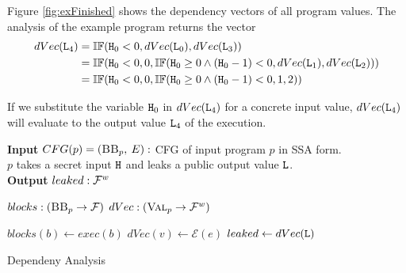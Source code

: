 Figure \ref{fig:exFinished} shows the dependency vectors of all program values. The analysis of the example program returns the vector
\begin{align*}
    dVec(\mathtt{L}_4) &= \mathbb{IF}(\mathtt{H}_0 < 0, dVec(\mathtt{L}_0), dVec(\mathtt{L}_3)) \\
    &= \mathbb{IF}(\mathtt{H}_0 < 0, 0, \mathbb{IF}(\mathtt{H}_0 \geq 0 \land (\mathtt{H}_0 - 1) < 0, dVec(\mathtt{L}_1), dVec(\mathtt{L}_2))) \\
    &= \mathbb{IF}(\mathtt{H}_0 < 0, 0, \mathbb{IF}(\mathtt{H}_0 \geq 0 \land (\mathtt{H}_0 - 1) < 0, 1, 2))
\end{align*}

If we substitute the variable $\mathtt{H}_0$ in $dVec(\mathtt{L}_4)$ for a concrete input value, $dVec(\mathtt{L}_4)$ will evaluate to the output value $\mathtt{L}_4$ of the execution.

\begin{algorithm}
        \hspace*{\algorithmicindent} \textbf{Input} $CFG(p) = (\mbb_p, \: E):$ CFG of input program $p$ in SSA form.\\ 
        \hspace*{\algorithmicindent} \hspace*{\algorithmicindent} $p$ takes a secret input $\mathtt{H}$ and leaks a public output value $\mathtt{L}$. \\
        \hspace*{\algorithmicindent} \textbf{Output} $leaked: \mathcal{F}^w$\\
        \begin{algorithmic}[1]
            \State $blocks: (\mbb_p \to \mbform)$
            \State $dVec: (\textsc{Val}_p \to \mathcal{F}^w)$
            
                \State $blocks(b) \leftarrow exec(b)$
                    \State $dVec(v) \leftarrow \mathcal{E}(e)$
                \EndFor
            \EndFor
            \State $leaked \leftarrow dVec(\mathtt{L})$
    \end{algorithmic} 
    \caption{Dependeny Analysis}\label{alg:depAna}
\end{algorithm}

